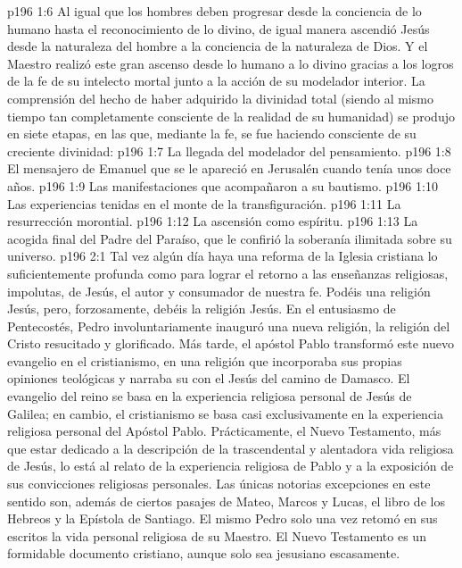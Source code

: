 \vs p196 1:6 Al igual que los hombres deben progresar desde la conciencia de lo humano hasta el reconocimiento de lo divino, de igual manera ascendió Jesús desde la naturaleza del hombre a la conciencia de la naturaleza de Dios. Y el Maestro realizó este gran ascenso desde lo humano a lo divino gracias a los logros de la fe de su intelecto mortal junto a la acción de su modelador interior. La comprensión del hecho de haber adquirido la divinidad total (siendo al mismo tiempo tan completamente consciente de la realidad de su humanidad) se produjo en siete etapas, en las que, mediante la fe, se fue haciendo consciente de su creciente divinidad:
\vs p196 1:7 La llegada del modelador del pensamiento.
\vs p196 1:8 El mensajero de Emanuel que se le apareció en Jerusalén cuando tenía unos doce años.
\vs p196 1:9 Las manifestaciones que acompañaron a su bautismo.
\vs p196 1:10 Las experiencias tenidas en el monte de la transfiguración.
\vs p196 1:11 La resurrección morontial.
\vs p196 1:12 La ascensión como espíritu.
\vs p196 1:13 La acogida final del Padre del Paraíso, que le confirió la soberanía ilimitada sobre su universo.
\vs p196 2:1 Tal vez algún día haya una reforma de la Iglesia cristiana lo suficientemente profunda como para lograr el retorno a las enseñanzas religiosas, impolutas, de Jesús, el autor y consumador de nuestra fe. Podéis  una religión  Jesús, pero, forzosamente, debéis  la religión  Jesús. En el entusiasmo de Pentecostés, Pedro involuntariamente inauguró una nueva religión, la religión del Cristo resucitado y glorificado. Más tarde, el apóstol Pablo transformó este nuevo evangelio en el cristianismo, en una religión que incorporaba sus propias opiniones teológicas y narraba su  con el Jesús del camino de Damasco. El evangelio del reino se basa en la experiencia religiosa personal de Jesús de Galilea; en cambio, el cristianismo se basa casi exclusivamente en la experiencia religiosa personal del Apóstol Pablo. Prácticamente, el Nuevo Testamento, más que estar dedicado a la descripción de la trascendental y alentadora vida religiosa de Jesús, lo está al relato de la experiencia religiosa de Pablo y a la exposición de sus convicciones religiosas personales. Las únicas notorias excepciones en este sentido son, además de ciertos pasajes de Mateo, Marcos y Lucas, el libro de los Hebreos y la Epístola de Santiago. El mismo Pedro solo una vez retomó en sus escritos la vida personal religiosa de su Maestro. El Nuevo Testamento es un formidable documento cristiano, aunque solo sea jesusiano escasamente.
